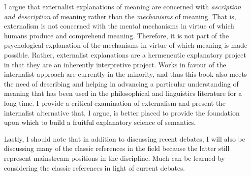 \begin{refsection}
I argue that externalist explanations of meaning are concerned with \textit{ascription and description }of meaning rather than the \textit{mechanisms} of meaning. That is, externalism is not concerned with the mental mechanisms in virtue of which humans produce and comprehend meaning. Therefore, it is not part of the psychological explanation of the mechanisms in virtue of which meaning is made possible. Rather, externalist explanations are a hermeneutic explanatory project in that they are an inherently interpretive project. Works in favour of the internalist approach are currently in the minority, and thus this book also meets the need of describing and helping in advancing a particular understanding of meaning that has been used in the philosophical and linguistics literature for a long time. I provide a critical examination of externalism and present the internalist alternative that, I argue, is better placed to provide the foundation upon which to build a fruitful explanatory science of semantics.

Lastly, I should note that in addition to discussing recent debates, I will also be discussing many of the classic references in the field because the latter still represent mainstream positions in the discipline. Much can be learned by considering the classic references in light of current debates.
\end{refsection}